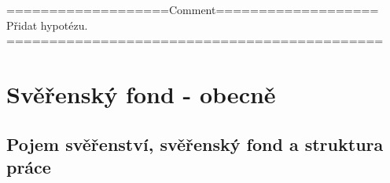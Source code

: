 \documentclass{article}
\begin{document}
{\color{green}\noindent===================Comment===================} \\
Přidat hypotézu.\\






{\color{green}\noindent============================================} \\

\newpage

\section{Svěřenský fond - obecně}

\subsection{Pojem svěřenství, svěřenský fond a struktura práce}
\end{document}
